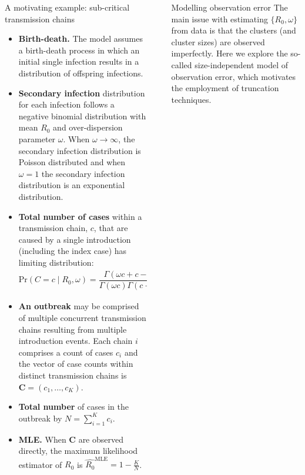\documentclass[final]{beamer}
\newcommand{\disp}{\omega}					%
\newcommand{\chain}{c}							%
\newcommand{\chains}{\mathbf{C}}		%
\newcommand{\nchains}{K}					  %
\newcommand{\ncases}{N}					    %
\newlength{\sepwidth}
\newlength{\colwidth}
\newcommand{\separatorcolumn}{\begin{column}{\sepwidth}\end{column}}
\begin{document}
\begin{frame}[t]
\begin{columns}[t]
\begin{column}{\colwidth}
\begin{block}{A motivating example: sub-critical transmission chains}
  \begin{itemize}
  \item \textbf{Birth-death.}  The model assumes a birth-death process in which an initial single infection results in a distribution of offspring infections.
  \item \textbf{Secondary infection} distribution for each infection follows a negative binomial distribution with mean $R_0$ and over-dispersion parameter $\disp$.
  When $\disp  \to \infty$, the secondary infection distribution is Poisson distributed and when $\disp = 1$  the secondary infection distribution is an exponential distribution.
  \item \textbf{Total number of cases} within a transmission chain, $\chain$, that are caused by a single introduction (including the index case) has limiting distribution:
  \begin{equation}
  \label{eq:R0_pmf}
  \text{Pr}(C = \chain \mid  R_0, \disp) = \frac{\Gamma(\disp \chain + \chain - 1)}{\Gamma(\disp \chain) \Gamma(\chain + 1)} \frac{(R_0/\disp)^{\chain-1}}{(1+R_0/\disp)^{\disp \chain + \chain - 1}}.
  \end{equation}
  \item \textbf{An outbreak} may be comprised of multiple concurrent transmission chains resulting from multiple introduction events.
  Each chain $i$ comprises a count of cases $\chain_i$ and the vector of case counts within distinct transmission chains is $\chains = (\chain_1, \ldots, \chain_\nchains)$.
  \item \textbf{Total number} of cases in the outbreak by $\ncases = \sum_{i=1}^\nchains \chain_i$.
  \item \textbf{MLE.} When $\chains$ are observed directly, the maximum likelihood estimator of $R_0$ is $\widehat{R_0}^{\text{MLE}} = 1 -\frac{K}{N}$.
  \end{itemize}
  \end{block}
  \end{column}

  \separatorcolumn

  \begin{column}{\colwidth}

  \begin{block}{Modelling observation error}
    The main issue with estimating $\{R_0, \disp\}$ from data is that the clusters (and cluster sizes) are observed imperfectly.
    Here we explore the so-called size-independent model of observation error, which motivates the employment of truncation techniques.


\end{block}
\end{column}
\end{columns}
\end{frame}
\end{document}
